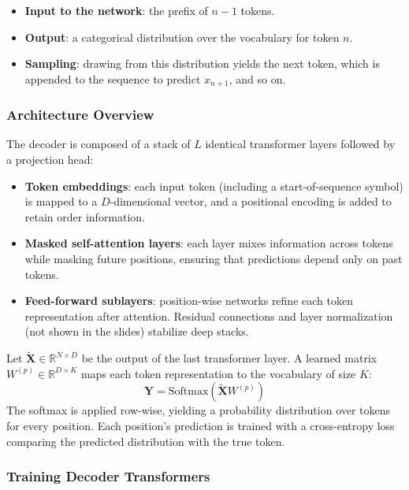 \documentclass[11pt,a4paper]{article}
\theoremstyle{definition}
\theoremstyle{plain}
\theoremstyle{remark}
\begin{document}
\begin{itemize}
    \item \textbf{Input to the network}: the prefix of $n-1$ tokens.
    \item \textbf{Output}: a categorical distribution over the vocabulary for token $n$.
    \item \textbf{Sampling}: drawing from this distribution yields the next token, which is appended to the sequence to predict $x_{n+1}$, and so on.
\end{itemize}

\subsubsection{Architecture Overview}

The decoder is composed of a stack of $L$ identical transformer layers followed by a projection head:
\begin{itemize}
    \item \textbf{Token embeddings}: each input token (including a start-of-sequence symbol) is mapped to a $D$-dimensional vector, and a positional encoding is added to retain order information.
    \item \textbf{Masked self-attention layers}: each layer mixes information across tokens while masking future positions, ensuring that predictions depend only on past tokens.
    \item \textbf{Feed-forward sublayers}: position-wise networks refine each token representation after attention. Residual connections and layer normalization (not shown in the slides) stabilize deep stacks.
\end{itemize}

\begin{tcolorbox}[colback=green!5!white,colframe=green!70!black,title=\textbf{Linear Softmax Module (LSM)}]
Let $\tilde{\mathbf{X}} \in \mathbb{R}^{N \times D}$ be the output of the last transformer layer. A learned matrix $W^{(p)} \in \mathbb{R}^{D \times K}$ maps each token representation to the vocabulary of size $K$:
\[
\mathbf{Y} = \text{Softmax}\left(\tilde{\mathbf{X}} W^{(p)}\right)
\]
The softmax is applied row-wise, yielding a probability distribution over tokens for every position. Each position's prediction is trained with a cross-entropy loss comparing the predicted distribution with the true token.
\end{tcolorbox}

\subsubsection{Training Decoder Transformers}
\end{document}
